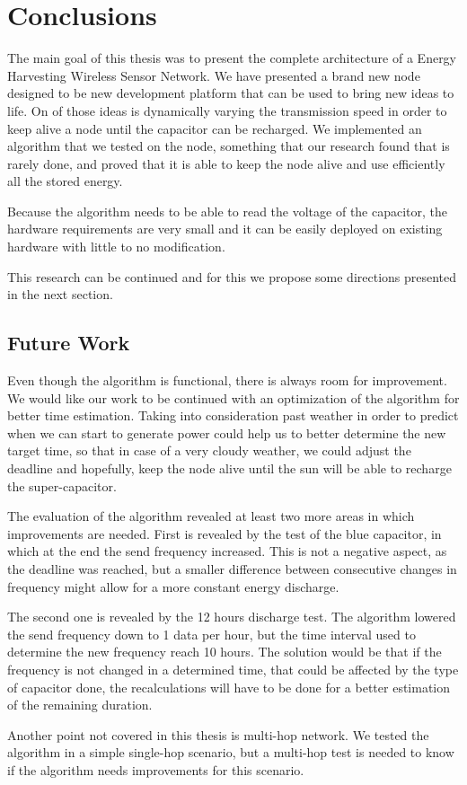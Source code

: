 \chapter{Conclusions}

The main goal of this thesis was to present the complete architecture of a Energy Harvesting Wireless Sensor
Network. We have presented a brand new node designed to be new development platform that can be used to
bring new ideas to life. On of those ideas is dynamically varying the transmission speed in order to
keep alive a node until the capacitor can be recharged. We implemented an algorithm that we tested
on the node, something that our research found that is rarely done, and proved that it is able to
keep the node alive and use efficiently all the stored energy.


Because the algorithm needs to be able to read the voltage of the capacitor, the hardware
requirements are very small and it can be easily deployed on existing hardware with little to no
modification.

This research can be continued and for this we propose some directions presented in the next
section.

\section{Future Work}

Even though the algorithm is functional, there is always room for improvement. We would like our
work to be continued with an optimization of the algorithm for better time estimation. Taking
into consideration past weather in order to predict when we can start to generate power could help us to
better determine the new target time, so that in case of a very cloudy weather, we could adjust the
deadline and hopefully, keep the node alive until the sun will be able to recharge the
super-capacitor.

The evaluation of the algorithm revealed at least two more areas in which improvements are needed. First
is revealed by the test of the blue capacitor, in which at the end the send frequency increased.
This is not a negative aspect, as the deadline was reached, but a smaller difference between
consecutive changes in frequency might allow for a more constant energy discharge.

The second one is revealed by the 12 hours discharge test. The algorithm lowered the send frequency
down to 1 data per hour, but the time interval used to determine the new frequency reach 10 hours.
The solution would be that if the frequency is not changed in a determined time, that could be
affected by the type of capacitor done, the recalculations will have to be done for a better
estimation of the remaining duration.

Another point not covered in this thesis is multi-hop network. We tested the algorithm in a simple
single-hop scenario, but a multi-hop test is needed to know if the algorithm needs improvements for
this scenario.
